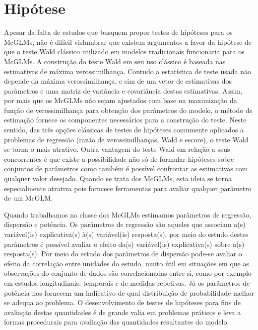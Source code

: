 
\section{Hipótese}

Apesar da falta de estudos que busquem propor testes de hipóteses para os McGLMs, não é difícil vislumbrar que existem argumentos a favor da hipótese de que o teste Wald clássico utilizado em modelos tradicionais funcionaria para os McGLMs. A construção do teste Wald em seu uso clássico é baseada nas estimativas de máxima verossimilhança. Contudo a estatística de teste usada não depende da máxima verossimilhança, e sim de um vetor de estimativas dos parâmetros e uma matriz de variância e covariância destas estimativas. Assim, por mais que os McGLMs não sejam ajustados com base na maximização da função de verossimilhança para obtenção dos parâmetros do modelo, o método de estimação fornece os componentes necessários para a construção do teste. Neste sentido, das três opções clássicas de testes de hipóteses comumente aplicados a problemas de regressão (razão de verossimilhanças, Wald e escore), o teste Wald se torna o mais atrativo. Outra vantagem do teste Wald em relação a seus concorrentes é que existe a possibilidade não só de formular hipóteses sobre conjuntos de parâmetros como também é possível confrontar as estimativas com qualquer valor desejado. Quando se trata dos McGLMs, esta ideia se torna especialmente atrativa pois forncece ferramentas para avaliar qualquer parâmetro de um McGLM. 

Quando trabalhamos na classe dos McGLMs estimamos parâmetros de regressão, dispersão e potência. Os parâmetros de regressão são aqueles que associam a(s) variável(is) explicativa(s) à(s) variável(is) resposta(s), por meio do estudo destes parâmetros é possível avaliar o efeito da(s) variável(is) explicativa(s) sobre a(s) resposta(s). Por meio do estudo dos parâmetros de dispersão pode-se avaliar o efeito da correlação entre unidades do estudo, muito útil em situações em que as observações do conjunto de dados são correlacionadas entre si, como por exemplo em estudos longitudinais, temporais e de medidas repetivas. Já os parâmetros de potência nos fornecem um indicativo de qual distribuição de probabilidade melhor se adequa ao problema. O desenvolvimento de testes de hipóteses para fins de avaliação destas quantidades é de grande valia em problemas práticos e leva a formas procedurais para avaliação das quantidades resultantes do modelo.

